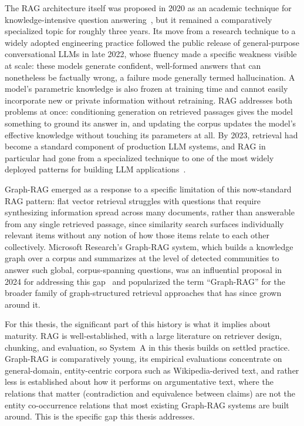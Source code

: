 The RAG architecture itself was proposed in 2020 as an academic technique for knowledge-intensive
question answering~\cite{lewis2020rag}, but it remained a comparatively specialized topic for
roughly three years. Its move from a research technique to a widely adopted engineering practice
followed the public release of general-purpose conversational LLMs in late 2022, whose fluency
made a specific weakness visible at scale: these models generate confident, well-formed answers
that can nonetheless be factually wrong, a failure mode generally termed hallucination. A model's
parametric knowledge is also frozen at training time and cannot easily incorporate new or
private information without retraining. RAG addresses both problems at once: conditioning
generation on retrieved passages gives the model something to ground its answer in, and updating
the corpus updates the model's effective knowledge without touching its parameters at all. By
2023, retrieval had become a standard component of production LLM systems, and RAG in particular
had gone from a specialized technique to one of the most widely deployed patterns for building
LLM applications~\cite{gao2023ragsurvey}.

Graph-RAG emerged as a response to a specific limitation of this now-standard RAG pattern: flat
vector retrieval struggles with questions that require synthesizing information spread across
many documents, rather than answerable from any single retrieved passage, since similarity
search surfaces individually relevant items without any notion of how those items relate to each
other collectively. Microsoft Research's Graph-RAG system, which builds a knowledge graph over a
corpus and summarizes at the level of detected communities to answer such
global, corpus-spanning questions, was an influential proposal in 2024 for addressing this
gap~\cite{edge2024graphrag} and popularized the term ``Graph-RAG'' for the broader family of
graph-structured retrieval approaches that has since grown around it.

For this thesis, the significant part of this history is what it implies about maturity. RAG is
well-established, with a large literature on retriever design, chunking, and evaluation, so
System~A in this thesis builds on settled practice. Graph-RAG is comparatively young, its
empirical evaluations concentrate on general-domain, entity-centric corpora such as
Wikipedia-derived text, and rather less is established about how it performs on argumentative
text, where the relations that matter (contradiction and equivalence between claims) are not the
entity co-occurrence relations that most existing Graph-RAG systems are built around. This is the
specific gap this thesis addresses.

